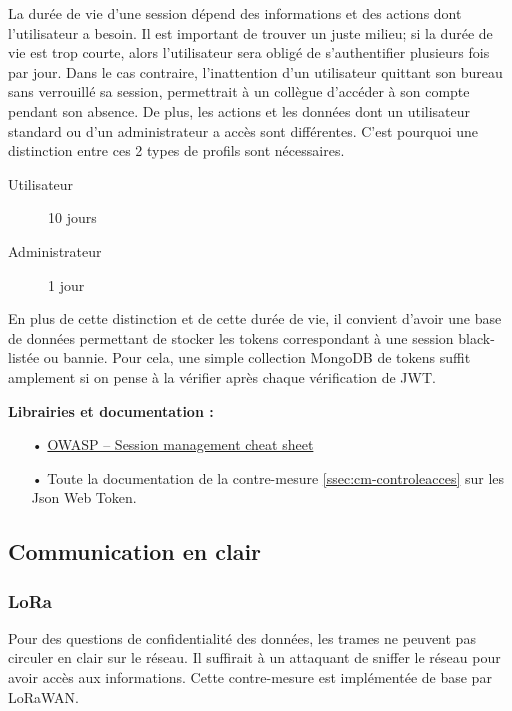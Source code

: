 La durée de vie d'une session dépend des informations et des actions dont l'utilisateur a besoin. Il est important de trouver un juste milieu; si la durée de vie est trop courte, alors l'utilisateur sera obligé de s'authentifier plusieurs fois par jour. Dans le cas contraire, l'inattention d'un utilisateur quittant son bureau sans verrouillé sa session, permettrait à un collègue d'accéder à son compte pendant son absence. De plus, les actions et les données dont un utilisateur standard ou d'un administrateur a accès sont différentes. C'est pourquoi une distinction entre ces 2 types de profils sont nécessaires.

\begin{description}
\item[Utilisateur] 10 jours
\item[Administrateur] 1 jour
\end{description}

En plus de cette distinction et de cette durée de vie, il convient d'avoir une base de données permettant de stocker les tokens correspondant à une session black-listée ou bannie. Pour cela, une simple collection MongoDB de tokens suffit amplement si on pense à la vérifier après chaque vérification de JWT.

\medskip
\textbf{Librairies et documentation :}

\begin{itemize}
\item[•] \href{https://www.owasp.org/index.php/Session_Management_Cheat_Sheet#Session_ID_Life_Cycle}{OWASP -- Session management cheat sheet}
\item[•] Toute la documentation de la contre-mesure \ref{ssec:cm-controleacces} sur les Json Web Token.
\end{itemize}

\subsection{Communication en clair}
\label{ssec:cm-tls}

\subsubsection{LoRa}

Pour des questions de confidentialité des données, les trames ne peuvent pas circuler en clair sur le réseau. Il suffirait à un attaquant de sniffer le réseau pour avoir accès aux informations. Cette contre-mesure est implémentée de base par LoRaWAN.

